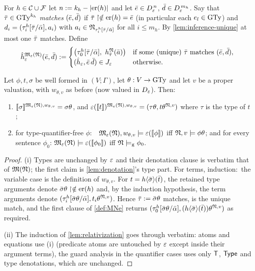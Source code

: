 \begin{definition}
  \label{def:MNe}
  For $h \in \mathcal{C} \cup \mathcal{F}$ let
  $n \mathrel{:=} k_h - |\mathrm{er}(h)|$ and let
  $\bar{e} \in D_{\varepsilon}^{\,n}$, $\bar{d} \in D_{\varepsilon}^{\,m_h}$.  Say that
  $\bar{\tau} \in \mathrm{GTy}^{k_h}$ \emph{matches} $(\bar{e}, \bar{d})$ if
  $\bar{\tau}\upharpoonright\notin\mathrm{er}(h) = \bar{e}$ (in particular each
  $e_l \in \mathrm{GTy}$) and
  $d_i = (\tau^h_i[\bar{\tau}/\bar{\alpha}], a_i)$ with
  $a_i \in \mathfrak{N}_{\tau^h_i[\bar{\tau}/\bar{\alpha}]}$ for all $i \le m_h$.  By
  \cref{lem:inference-unique} at most one $\bar{\tau}$ matches.  Define
  \[
    \hat h_{\varepsilon}^{\mathfrak{M}_{\varepsilon}(\mathfrak{N})}(\bar{e}, \bar{d}) \mathrel{:=}
    \begin{cases}
      \bigl(\tau^h_0[\bar{\tau}/\bar{\alpha}],\
            h^{\mathfrak{N}}_{\bar{\tau}}(\bar{a})\bigr)
      & \text{if some (unique) } \bar{\tau} \text{ matches } (\bar{e},\bar{d}),\\
      (\hat h_{\varepsilon}, \bar{e}\,\bar{d}) \in J_{\varepsilon} & \text{otherwise.}
    \end{cases}
  \]
\end{definition}

\begin{lemma}
  \label{lem:erasure-relativization}
  Let $\phi, t, \sigma$ be well formed in $(V;\Gamma)$, let
  $\theta : V \rightarrow \mathrm{GTy}$ and let $v$ be a proper valuation, with
  $w_{\theta,v}$ as before (now valued in $D_{\varepsilon}$).  Then:
  \begin{enumerate}[label=(\roman*)]
  \item $[\![ \sigma ]\!]^{\mathfrak{M}_{\varepsilon}(\mathfrak{N}), w_{\theta,v}} = \sigma\theta$, and
    $\varepsilon([\![ t ]\!])^{\mathfrak{M}_{\varepsilon}(\mathfrak{N}), w_{\theta,v}} =
    (\tau\theta, t\theta^{\mathfrak{N},v})$ where $\tau$ is the type of $t$;
  \item for type-quantifier-free $\phi$:\ \
    $\mathfrak{M}_{\varepsilon}(\mathfrak{N}), w_{\theta,v} \models \varepsilon([\![ \phi ]\!])$ iff
    $\mathfrak{N}, v \models \phi\theta$; and for every sentence $\phi_0$:
    $\mathfrak{M}_{\varepsilon}(\mathfrak{N}) \models \varepsilon([\![ \phi_0 ]\!])$ iff $\mathfrak{N} \models_{\mathrm{g}} \phi_0$.
  \end{enumerate}
\end{lemma}

\begin{proof}
  (i) Types are unchanged by $\varepsilon$ and their denotation clause is
  verbatim that of $\mathfrak{M}(\mathfrak{N})$; the first claim is \cref{lem:denotation}'s
  type part.  For terms, induction:\ the variable case is the definition
  of $w_{\theta,v}$.  For $t = h\langle\bar{\sigma}\rangle(\bar{t})$, the
  retained type arguments denote
  $\bar{\sigma}\theta\upharpoonright\notin\mathrm{er}(h)$ and, by the induction
  hypothesis, the term arguments denote
  $(\tau^h_i[\bar{\sigma}\theta/\bar{\alpha}], t_i\theta^{\mathfrak{N},v})$.
  Hence $\bar{\tau} \mathrel{:=} \bar{\sigma}\theta$ matches, is the unique match,
  and the first clause of \cref{def:MNe} returns
  $(\tau^h_0[\bar{\sigma}\theta/\bar{\alpha}],
  (h\langle\bar{\sigma}\rangle(\bar{t}))\theta^{\mathfrak{N},v})$ as required.

  (ii) The induction of \cref{lem:relativization} goes through verbatim:
  atoms and equations use (i) (predicate atoms are untouched by $\varepsilon$
  except inside their argument terms), the guard analysis in the
  quantifier cases uses only $\mathsf{T}$, $\mathsf{Type}$ and type denotations, which
  are unchanged.
\end{proof}

